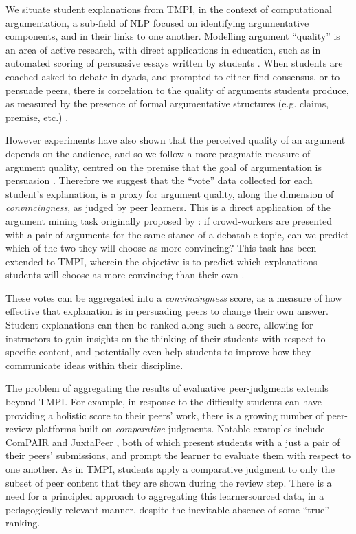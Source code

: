 \documentclass[notitlepage,12pt]{jedm}
\begin{document}
We situate student explanations from TMPI, in the context of computational 
argumentation, a sub-field of NLP focused on identifying argumentative 
components, and in their links to one another.
Modelling argument ``quality'' is an area of active research, with direct 
applications in education, such as in automated scoring of 
persuasive essays written by students \cite{persing_modeling_2015} 
\cite{nguyen_argument_2018}.
When students are coached asked to debate in dyads, and prompted to either find 
consensus, or to persuade peers, there is correlation to the quality of 
arguments students produce, as measured by the presence of formal argumentative 
structures (e.g. claims, premise, etc.) \cite{garcia-mila_effect_2013}.

However experiments have also shown that the perceived quality of an argument 
depends on the audience, and so we follow a more pragmatic measure of argument 
quality, centred on the premise that the goal of argumentation is 
persuasion \cite{mercier_why_2011}.
Therefore we suggest that the ``vote'' data collected for each student's 
explanation, is a proxy for argument quality, along the dimension of 
\textit{convincingness}, as judged by peer learners. 
This is a direct application of the argument mining task originally proposed by 
\cite{habernal_which_2016}: if crowd-workers are presented with a pair of 
arguments for the same stance of a debatable topic, can we predict which of the 
two they will choose as more convincing?
This task has been extended to TMPI, wherein the objective is to predict which 
explanations students will choose as more convincing than their own 
\cite{bhatnagar_learnersourcing_2020}.

These votes can be aggregated into a \textit{convincingness} score, as a 
measure of how effective that explanation is in persuading peers to change 
their own answer.
Student explanations can then be ranked along such a score, allowing for 
instructors to gain insights on the thinking of their students with respect to 
specific content, and potentially even help students to improve how they 
communicate ideas within their discipline.

The problem of aggregating the results of evaluative peer-judgments extends  
beyond TMPI.
For example, in response to the difficulty students can have providing a 
holistic score to their peers' work, there is a growing number of peer-review 
platforms built on \textit{comparative} judgments.
Notable examples include ComPAIR \cite{potter_compair:_2017} and 
JuxtaPeer \cite{cambre_juxtapeer:_2018}, both of which present students with a 
just a pair of their peers' submissions, and prompt the learner to evaluate 
them with respect to one another.
As in TMPI, students apply a comparative judgment to only the subset of peer 
content that they are shown during the review step.
There is a need for a principled approach to aggregating this learnersourced 
data, in a pedagogically relevant manner, despite the inevitable absence of 
some ``true'' ranking.
\end{document}
